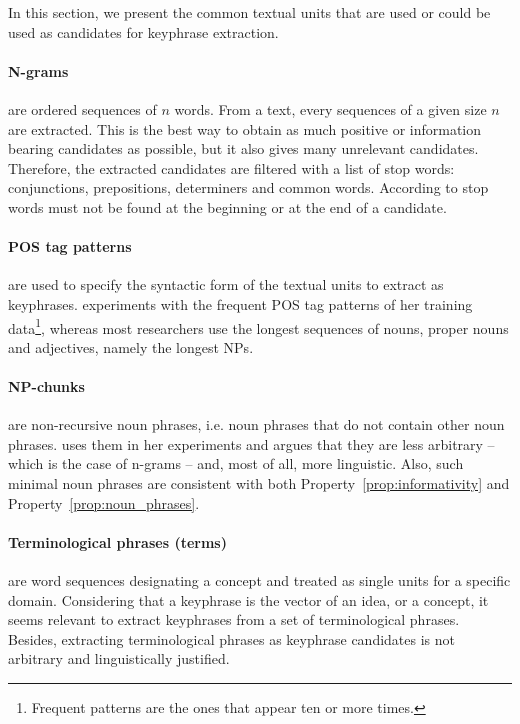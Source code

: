   In this section, we present the common textual units that are used or could be
  used as candidates for keyphrase extraction.

  \paragraph{N-grams} are ordered sequences of $n$ words. From a text, every
  sequences of a given size $n$ are extracted. This is the best way to obtain as
  much positive or information bearing candidates as possible, but it also gives
  many unrelevant candidates. Therefore, the extracted candidates are filtered
  with a list of stop words: conjunctions, prepositions, determiners  and common
  words. According to  stop words must not be found at
  the beginning or at the end of a candidate.

  \paragraph{POS tag patterns} are used to specify the syntactic form of the
  textual units to extract as keyphrases. 
  experiments with the frequent POS tag patterns of her training
  data\footnote{Frequent patterns are the ones that appear ten or more times.},
  whereas most researchers use the longest sequences of nouns, proper nouns and
  adjectives, namely the longest NPs.

  \paragraph{NP-chunks} are non-recursive noun phrases, i.e. noun phrases that
  do not contain other noun phrases.  uses
  them in her experiments and argues that they are less arbitrary -- which is
  the case of n-grams -- and, most of all, more linguistic. Also, such minimal
  noun phrases are consistent with both Property~\ref{prop:informativity} and
  Property~\ref{prop:noun_phrases}.

  \paragraph{Terminological phrases (terms)} are word sequences designating a
  concept and treated as single units for a specific domain. Considering that a
  keyphrase is the vector of an idea, or a concept, it seems relevant to extract
  keyphrases from  a set of terminological phrases. Besides, extracting
  terminological phrases as keyphrase candidates is not arbitrary and
  linguistically justified.

